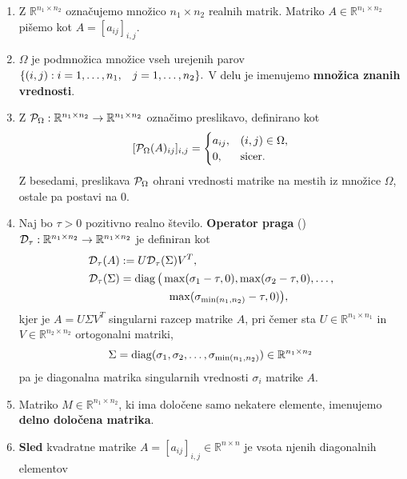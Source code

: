 \begin{enumerate}
  \item Z $\mathbb{R}^{n_1\times n_2}$ označujemo množico $n_1\times n_2$ realnih matrik. Matriko $A\in \mathbb{R}^{n_1\times n_2}$ pišemo kot $A=[a_{ij}]_{i,j}$.
  \item $\Omega$ je podmnožica množice vseh urejenih parov $\{ (i, j) : i = 1, \hdots , n_1, \hspace{0.3cm} j = 1, \hdots, n_2 \}.$ V delu je imenujemo \textbf{množica znanih vrednosti}.
  \item
        Z $\mathcal{P}_\Omega:\mathbb{R}^{n_1\times n_2}\to \mathbb{R}^{n_1\times n_2}$
        označimo preslikavo, definirano kot
        \[ [\mathcal{P}_\Omega(A)_{ij}]_{i,j} = \begin{cases}
            a_{ij}, & (i, j) \in \Omega, \\
            0,      & \text{sicer}.
          \end{cases}
        \]
        Z besedami, preslikava $\mathcal{P}_\Omega$ ohrani vrednosti matrike na mestih iz množice $\Omega$, ostale pa postavi na 0.
  \item Naj bo $\tau > 0$ pozitivno realno število.
        \textbf{Operator praga} (\cite{CCS}) $\mathcal{D}_\tau: \mathbb{R}^{n_1 \times n_2} \rightarrow \mathbb{R}^{n_1 \times n_2}$ je definiran kot
        \begin{align}
          \label{1007-1959}
          \begin{split}
            \mathcal{D}_\tau(A) &:= U \mathcal{D}_\tau(\Sigma) V^T, \\ \mathcal{D}_\tau(\Sigma) &= \operatorname{diag}\big(\max(\sigma_1 - \tau, 0),
            \max(\sigma_2-\tau,0),\ldots,\\
            &\hspace{1.5cm}
            \max(\sigma_{\min(n_1,n_2)}-\tau,0)\big),
          \end{split}
        \end{align}
        kjer je $A=U\Sigma V^T$
        singularni razcep matrike $A$, pri čemer sta $U\in \mathbb{R}^{n_1\times n_1}$
        in $V\in \mathbb R^{n_2\times n_2}$ ortogonalni matriki,
        $$\Sigma=\operatorname{diag}(\sigma_1,\sigma_2,\ldots,\sigma_{\min(n_1,n_2)})\in \mathbb R^{n_1\times n_2}$$ pa je diagonalna matrika singularnih vrednosti $\sigma_i$ matrike $A$.
  \item Matriko $M \in \mathbb{R}^{n_1 \times n_2}$, ki ima določene samo nekatere elemente, imenujemo \textbf{delno določena matrika}.
  \item \textbf{Sled} kvadratne  matrike $A=[a_{ij}]_{i,j}\in \mathbb R^{n\times n}$ je vsota njenih diagonalnih elementov

\end{enumerate}
